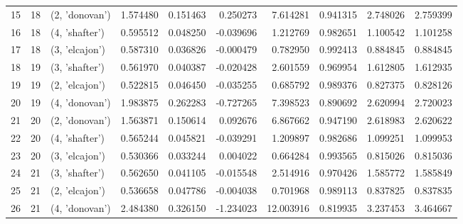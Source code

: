 \begin{tabular}{lrlrrrrrrr}
15 &     18 &  (2, 'donovan') &  1.574480 &   0.151463 &  0.250273 &   7.614281 &  0.941315 &   2.748026 &  2.759399 \\
16 &     18 &  (4, 'shafter') &  0.595512 &   0.048250 & -0.039696 &   1.212769 &  0.982651 &   1.100542 &  1.101258 \\
17 &     18 &  (3, 'elcajon') &  0.587310 &   0.036826 & -0.000479 &   0.782950 &  0.992413 &   0.884845 &  0.884845 \\
18 &     19 &  (3, 'shafter') &  0.561970 &   0.040387 & -0.020428 &   2.601559 &  0.969954 &   1.612805 &  1.612935 \\
19 &     19 &  (2, 'elcajon') &  0.522815 &   0.046450 & -0.035255 &   0.685792 &  0.989376 &   0.827375 &  0.828126 \\
20 &     19 &  (4, 'donovan') &  1.983875 &   0.262283 & -0.727265 &   7.398523 &  0.890692 &   2.620994 &  2.720023 \\
21 &     20 &  (2, 'donovan') &  1.563871 &   0.150614 &  0.092676 &   6.867662 &  0.947190 &   2.618983 &  2.620622 \\
22 &     20 &  (4, 'shafter') &  0.565244 &   0.045821 & -0.039291 &   1.209897 &  0.982686 &   1.099251 &  1.099953 \\
23 &     20 &  (3, 'elcajon') &  0.530366 &   0.033244 &  0.004022 &   0.664284 &  0.993565 &   0.815026 &  0.815036 \\
24 &     21 &  (3, 'shafter') &  0.562650 &   0.041105 & -0.015548 &   2.514916 &  0.970426 &   1.585772 &  1.585849 \\
25 &     21 &  (2, 'elcajon') &  0.536658 &   0.047786 & -0.004038 &   0.701968 &  0.989113 &   0.837825 &  0.837835 \\
26 &     21 &  (4, 'donovan') &  2.484380 &   0.326150 & -1.234023 &  12.003916 &  0.819935 &   3.237453 &  3.464667 \\
\bottomrule
\end{tabular}
